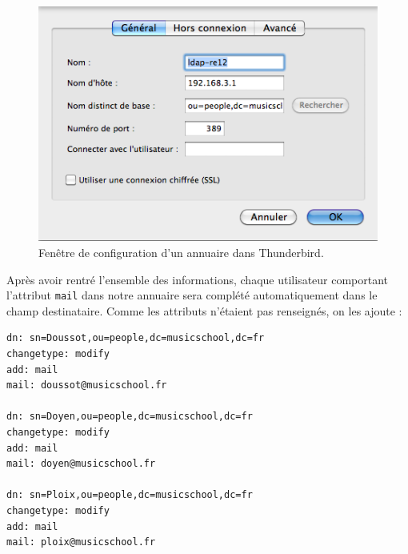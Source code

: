 \documentclass[12pt,a4paper,notitlepage]{article}
\begin{document}
\begin{figure}[!h]
\begin{center}
\includegraphics[scale=0.61]{thunderbird-ldap}
\caption{Fenêtre de configuration d'un annuaire dans Thunderbird.}
\label{fig:da}
\end{center}
\end{figure}

Après avoir rentré l'ensemble des informations, chaque utilisateur comportant l'attribut \texttt{mail} dans notre annuaire sera complété automatiquement dans le champ destinataire. Comme les attributs n'étaient pas renseignés, on les ajoute :\\

\begin{lstlisting}[title=ajout-mail.ldif]
dn: sn=Doussot,ou=people,dc=musicschool,dc=fr
changetype: modify
add: mail
mail: doussot@musicschool.fr

dn: sn=Doyen,ou=people,dc=musicschool,dc=fr
changetype: modify
add: mail
mail: doyen@musicschool.fr

dn: sn=Ploix,ou=people,dc=musicschool,dc=fr
changetype: modify
add: mail
mail: ploix@musicschool.fr
\end{lstlisting}
\end{document}
